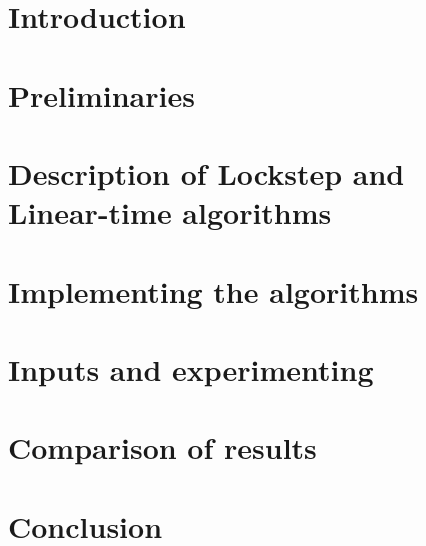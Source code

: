 \documentclass[a4, english]{article}
\title{\titlecontent}
\author{Magdalena Kalin-Czerska}
\author{Mikael Bisgaard Dahlsen-Jensen}
\affil{Aarhus University}
\newcommand{\sectionpath}{../sections/}
\begin{document}
\maketitle


\newpage
\section{Introduction}

\section{Preliminaries}

\section{Description of  Lockstep and Linear-time algorithms}

\section{Implementing the algorithms}


\section{Inputs and experimenting}


\section{Comparison of results}


\section{Conclusion}

\printbibliography
\appendix

\end{document}
